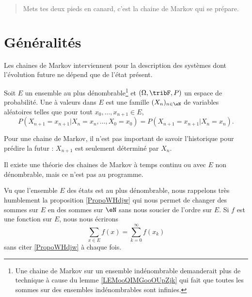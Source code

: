 
\begin{quote}
	Mets tes deux pieds en canard, c'est la chaine de Markov qui se prépare.
\end{quote}

\section{Généralités}

Les chaines de Markov interviennent pour la description des systèmes dont l'évolution future ne dépend que de l'état présent.

\begin{definition}      \label{DEFooGDPFooWsvfRv}
	Soit \( E\) un ensemble au plus dénombrable\footnote{Une chaine de Markov sur un ensemble indénombrable demanderait plus de technique à cause du lemme \ref{LEMooQIMGooOUpZjk} qui fait que toutes les sommes sur des ensembles indénombrables sont infinies.} et \( (\Omega,\tribF,P)\) un espace de probabilité. Une  à valeurs dans \( E\) est une famille \( (X_n)_{n\in\eN}\) de variables aléatoires telles que pour tout \( x_0,\ldots,x_{n+1}\in E\),
	\begin{equation}
		P(X_{n+1}=x_{n+1}|X_n=x_n,\ldots,X_0=x_0)=P(X_{n+1}=x_{n+1}|X_n=x_n).
	\end{equation}
\end{definition}
Pour une chaine de Markov, il n'est pas important de savoir l'historique pour prédire la futur : \( X_{n+1}\) est seulement déterminé par \( X_n\).

\begin{remark}
	Il existe une théorie des chaines de Markov à temps continu ou avec \( E\) non dénombrable, mais ce n'est pas au programme.
\end{remark}

\begin{normaltext}
	Vu que l'ensemble \( E\) des états est au plus dénombrable, nous rappelons très humblement  la proposition \ref{PropoWHdjw} qui nous permet de changer des sommes sur \( E\) en des sommes sur \( \eN\) sans nous soucier de l'ordre sur \( E\). Si \( f\) est une fonction sur \( E\), nous nous écrirons
	\begin{equation}
		\sum_{x\in E}f(x)=\sum_{k=0}^{\infty}f(x_k)
	\end{equation}
	sans citer \ref{PropoWHdjw} à chaque fois.
\end{normaltext}

